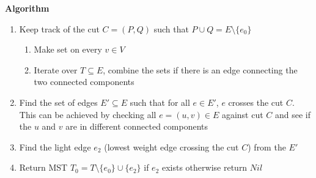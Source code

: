 \documentclass[11pt]{article}
\begin{document}
\begin{enumerate}
        \begin{solution}
           \textbf{Algorithm}
            \begin{enumerate}
                \item Keep track of the cut $C = (P, Q)$ such that $P\cup Q = E\setminus \{ e_0 \}$
                \begin{enumerate}
                    \item Make set on every $v\in V$
                    \item Iterate over $T\subseteq E$, combine the sets if there is an edge connecting the two connected components
                \end{enumerate}
                \item Find the set of edges $E' \subseteq E$ such that for all $e\in E'$, $e$ crosses the cut $C$. This can be achieved by checking all $e  = (u,v)\in E$ against cut $C$ and see if the $u$ and $v$ are in different connected components 
                \item Find the light edge $e_2$ (lowest weight edge crossing the cut $C$) from the $E'$ 
                \item Return MST $T_0 = T \setminus \{ e_0 \} \cup\{e_2 \}$ if $e_2$ exists otherwise return $Nil$
            \end{enumerate}
        \end{solution}



        \begin{algorithm}[H]

            
\end{algorithm}
\end{enumerate}
\end{document}
